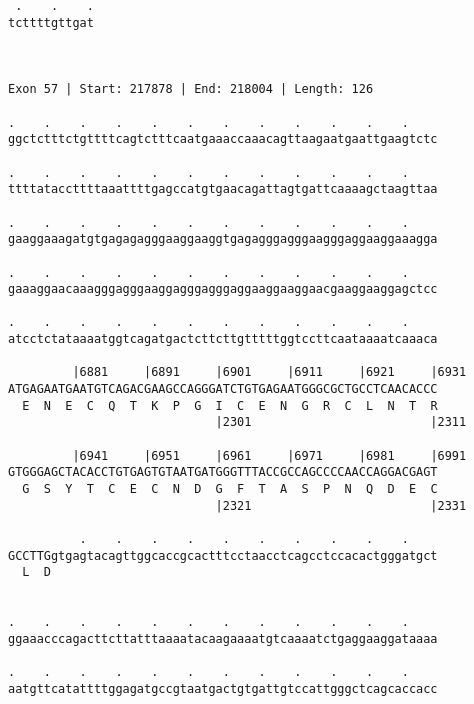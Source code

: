 \documentclass{article}
\begin{document}
\begin{Verbatim}
 .    .    .
tcttttgttgat
            
            
 
Exon 57 | Start: 217878 | End: 218004 | Length: 126
 
.    .    .    .    .    .    .    .    .    .    .    .    
ggctctttctgttttcagtctttcaatgaaaccaaacagttaagaatgaattgaagtctc
                                                            
.    .    .    .    .    .    .    .    .    .    .    .    
ttttataccttttaaattttgagccatgtgaacagattagtgattcaaaagctaagttaa
                                                            
.    .    .    .    .    .    .    .    .    .    .    .    
gaaggaaagatgtgagagagggaaggaaggtgagagggagggaagggaggaaggaaagga
                                                            
.    .    .    .    .    .    .    .    .    .    .    .    
gaaaggaacaaagggagggaaggagggagggaggaaggaaggaacgaaggaaggagctcc
                                                            
.    .    .    .    .    .    .    .    .    .    .    .    
atcctctataaaatggtcagatgactcttcttgtttttggtccttcaataaaatcaaaca
                                                            
         |6881     |6891     |6901     |6911     |6921     |6931
ATGAGAATGAATGTCAGACGAAGCCAGGGATCTGTGAGAATGGGCGCTGCCTCAACACCC
  E  N  E  C  Q  T  K  P  G  I  C  E  N  G  R  C  L  N  T  R
                             |2301                         |2311
  
         |6941     |6951     |6961     |6971     |6981     |6991
GTGGGAGCTACACCTGTGAGTGTAATGATGGGTTTACCGCCAGCCCCAACCAGGACGAGT
  G  S  Y  T  C  E  C  N  D  G  F  T  A  S  P  N  Q  D  E  C
                             |2321                         |2331
  
          .    .    .    .    .    .    .    .    .    .    
GCCTTGgtgagtacagttggcaccgcactttcctaacctcagcctccacactgggatgct
  L  D                                                      
                                                            
  
.    .    .    .    .    .    .    .    .    .    .    .    
ggaaacccagacttcttatttaaaatacaagaaaatgtcaaaatctgaggaaggataaaa
                                                            
.    .    .    .    .    .    .    .    .    .    .    .    
aatgttcatattttggagatgccgtaatgactgtgattgtccattgggctcagcaccacc
                                                            

\end{Verbatim}
\end{document}
